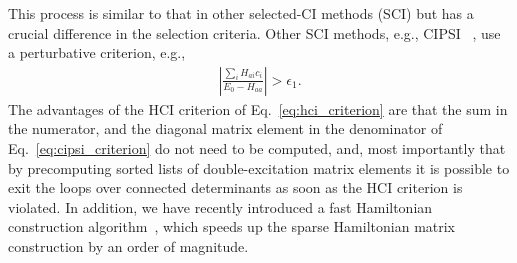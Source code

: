 \documentclass[%
reprint,
 superscriptaddress,
 amsmath,amssymb,
 aps,
]{revtex4-1}
\def\beq{\begin{eqnarray}}
\def\eeq{\end{eqnarray}}
\begin{document}
This process is similar to that in other selected-CI methods (SCI) but has a crucial difference in the selection criteria.
Other SCI methods, e.g., CIPSI ~\cite{HurMalRan-JCP-73}, use a perturbative criterion, e.g.,
\beq
\left|\frac{\sum_{i} H_{ai} c_{i}}{E_{0} - H_{aa}}\right| > \epsilon_{1}.
\label{eq:cipsi_criterion}
\eeq
The advantages of the HCI criterion of Eq.~\ref{eq:hci_criterion} are that the sum in the numerator, and the diagonal matrix
element in the denominator of Eq.~\ref{eq:cipsi_criterion} do not need to be computed, and, most importantly that by
precomputing sorted lists of double-excitation matrix elements it is possible to exit the loops over connected determinants
as soon as the HCI criterion is violated.
In addition, we have recently introduced a fast Hamiltonian construction algorithm~\cite{LiOttHolShaUmr-JCP-18}, which speeds up the sparse Hamiltonian matrix construction by an order of magnitude.
\end{document}
